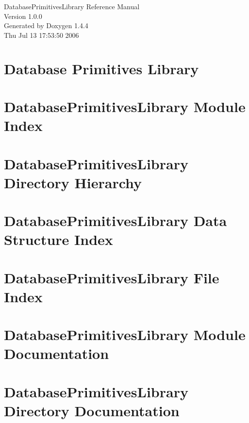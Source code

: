 \documentclass[letterpaper]{book}
\begin{document}
\begin{titlepage}
\vspace*{7cm}
\begin{center}
{\Large Database\-Primitives\-Library Reference Manual\\[1ex]\large Version 1.0.0 }\\
\vspace*{1cm}
{\large Generated by Doxygen 1.4.4}\\
\vspace*{0.5cm}
{\small Thu Jul 13 17:53:50 2006}\\
\end{center}
\end{titlepage}
\clearemptydoublepage
{}
\tableofcontents
\clearemptydoublepage
{}
\chapter{Database Primitives Library }
\label{index}\hypertarget{index}{}
\chapter{Database\-Primitives\-Library Module Index}

\chapter{Database\-Primitives\-Library Directory Hierarchy}

\chapter{Database\-Primitives\-Library Data Structure Index}

\chapter{Database\-Primitives\-Library File Index}

\chapter{Database\-Primitives\-Library Module Documentation}





\chapter{Database\-Primitives\-Library Directory Documentation}

\end{document}
